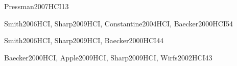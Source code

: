 \begin{syllabus}
\begin{unit}{\PLObjectOrientedProgrammingDef}{Pressman2007HCI}{1}{3}
    \begin{topics}%
	 \item \PLObjectOrientedProgrammingTopicObject
	 \item \PLObjectOrientedProgrammingTopicUML
	 \item \PLObjectOrientedProgrammingTopicClasses
	 \item \PLObjectOrientedProgrammingTopicInheritance
	 \item \PLObjectOrientedProgrammingTopicClasshierarchies
	 \item \PLObjectOrientedProgrammingTopicCollection
    \end{topics}%
    \begin{learningoutcomes}%
	 \item \PLObjectOrientedProgrammingObjONE
	 \item \PLObjectOrientedProgrammingObjTWO
	 \item \PLObjectOrientedProgrammingObjFOUR
	 \item \PLObjectOrientedProgrammingObjSEVEN
    \end{learningoutcomes}%
\end{unit}


\begin{unit}{\HCUserCenteredSoftwareDevelopmentDef}{Smith2006HCI, Sharp2009HCI, Constantine2004HCI, Baecker2000HCI}{5}{4}
    \HCUserCenteredSoftwareDevelopmentAllTopics
    \HCUserCenteredSoftwareDevelopmentAllObjectives
\end{unit}

\begin{unit}{\HCUserCenteredSoftwareEvaluationDef}{Smith2006HCI, Sharp2009HCI, Baecker2000HCI}{4}{4}
    \HCUserCenteredSoftwareEvaluationAllTopics
    \HCUserCenteredSoftwareEvaluationAllObjectives
\end{unit}

\begin{unit}{\HCGUIDesignDef}{Baecker2000HCI, Apple2009HCI, Sharp2009HCI, Wirfs2002HCI}{4}{3}
    \HCGUIDesignAllTopics
    \HCGUIDesignAllObjectives
\end{unit}


\end{syllabus}
